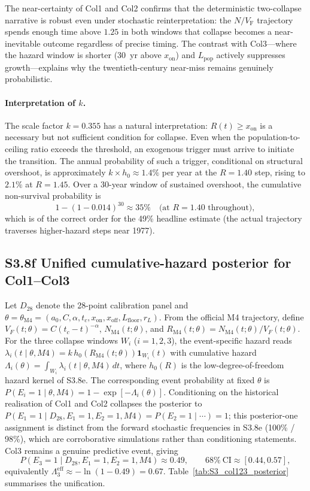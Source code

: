 \documentclass[11pt]{article}
\newcommand{\VF}{V_{\mathrm{F}}}
\begin{document}
\noindent The near-certainty of Col1 and Col2 confirms that the
deterministic two-collapse narrative is robust even under stochastic
reinterpretation: the $N/\VF$ trajectory spends enough time above
$1.25$ in both windows that collapse becomes a near-inevitable
outcome regardless of precise timing.  The contrast with Col3---where
the hazard window is shorter (30~yr above $x_{\mathrm{on}}$) and
$L_{\mathrm{pop}}$ actively suppresses growth---explains why the
twentieth-century near-miss remains genuinely probabilistic.

\paragraph{Interpretation of $k$.}
The scale factor $k = 0.355$ has a natural interpretation:
$R(t) \ge x_{\mathrm{on}}$ is a necessary but not sufficient condition
for collapse.  Even when the population-to-ceiling ratio exceeds the
threshold, an exogenous trigger must arrive to initiate the transition.
The annual probability of such a trigger, conditional on structural
overshoot, is approximately $k \times h_0 \approx 1.4\%$ per year at the
$R = 1.40$ step, rising to $2.1\%$ at $R = 1.45$.  Over a 30-year
window of sustained overshoot, the cumulative non-survival probability is
\[
1 - (1 - 0.014)^{30} \approx 35\%
\quad\text{(at }R = 1.40\text{ throughout)},
\]
which is of the correct order for the 49\% headline estimate
(the actual trajectory traverses higher-hazard steps near 1977).

\subsection*{S3.8f Unified cumulative-hazard posterior for Col1--Col3}
Let $D_{28}$ denote the 28-point calibration panel and $\theta=\theta_{\mathrm{M4}}=(a_0,C,\alpha,t_c,x_{\mathrm{on}},x_{\mathrm{off}},L_{\mathrm{floor}},r_L)$.  From the official M4 trajectory, define $V_F(t;\theta)=C(t_c-t)^{-\alpha}$, $N_{\mathrm{M4}}(t;\theta)$, and $R_{\mathrm{M4}}(t;\theta)=N_{\mathrm{M4}}(t;\theta)/V_F(t;\theta)$.  For the three collapse windows $W_i$ ($i{=}1,2,3$), the event-specific hazard reads $\lambda_i(t\mid\theta,M4)=k\,h_0(R_{\mathrm{M4}}(t;\theta))\mathbf 1_{W_i}(t)$ with cumulative hazard $\Lambda_i(\theta)=\int_{W_i}\lambda_i(t\mid\theta,M4)\,dt$, where $h_0(R)$ is the low-degree-of-freedom hazard kernel of S3.8e.  The corresponding event probability at fixed $\theta$ is $P(E_i{=}1\mid\theta,M4)=1-\exp[-\Lambda_i(\theta)]$.  Conditioning on the historical realisation of Col1 and Col2 collapses the posterior to $P(E_1{=}1\mid D_{28},E_1{=}1,E_2{=}1,M4)=P(E_2{=}1\mid\cdots)=1$; this posterior-one assignment is distinct from the forward stochastic frequencies in S3.8e (100\% / 98\%), which are corroborative simulations rather than conditioning statements.  Col3 remains a genuine predictive event, giving
\[
P(E_3{=}1\mid D_{28},E_1{=}1,E_2{=}1,M4)\approx 0.49,\qquad 68\%~\mathrm{CI}\approx[0.44,0.57],
\]
equivalently $\Lambda_3^{\mathrm{eff}}\approx-\ln(1-0.49)=0.67$.  Table~\ref{tab:S3_col123_posterior} summarises the unification.
\end{document}
